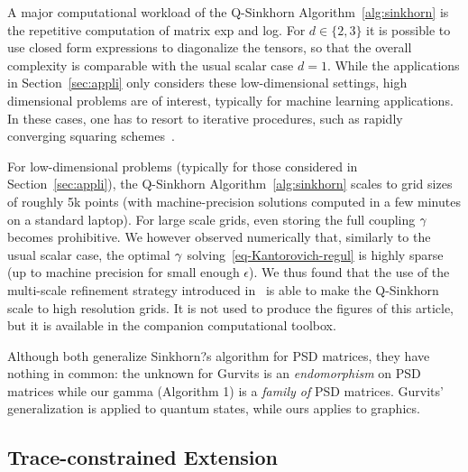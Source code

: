 

\begin{rem}
A major computational workload of the Q-Sinkhorn Algorithm~\ref{alg:sinkhorn} is the repetitive computation of matrix exp and log. 
%
For $d \in \{2,3\}$ it is possible to use closed form expressions to diagonalize the tensors, so that the overall complexity is comparable with the usual scalar case $d=1$.
%
While the applications in Section~\ref{sec:appli} only considers these low-dimensional settings, high dimensional problems are of interest, typically for machine learning applications.  In these cases, one has to resort to iterative procedures, such as rapidly converging squaring schemes~\cite{HighamExp,HighamLog}.
\end{rem}

\begin{rem}
For low-dimensional problems (typically for those considered in Section~\ref{sec:appli}), the Q-Sinkhorn Algorithm~\ref{alg:sinkhorn} scales to grid sizes of roughly 5k points (with machine-precision solutions computed in a few minutes on a standard laptop).
%
For large scale grids, even storing the full coupling $\gamma$ becomes prohibitive. We however observed numerically that, similarly  to the usual scalar case, the optimal $\gamma$ solving~\eqref{eq-Kantorovich-regul} is highly sparse (up to machine precision for small enough $\epsilon$).
% 
We thus found that the use of the multi-scale refinement strategy introduced in~\cite{Schmitzer2016} is able to make the Q-Sinkhorn scale to high resolution grids.  It is not used to produce the figures of this article, but it is available in the companion computational toolbox.
\end{rem}

\begin{rem}
 Although both generalize Sinkhorn?s algorithm for PSD matrices, they have nothing in common: the unknown for Gurvits is an \emph{endomorphism} on PSD matrices while our gamma (Algorithm 1) is a \emph{family of} PSD matrices. Gurvits' generalization is applied to quantum states, while ours applies to graphics. 
\end{rem}


\subsection{Trace-constrained Extension}

